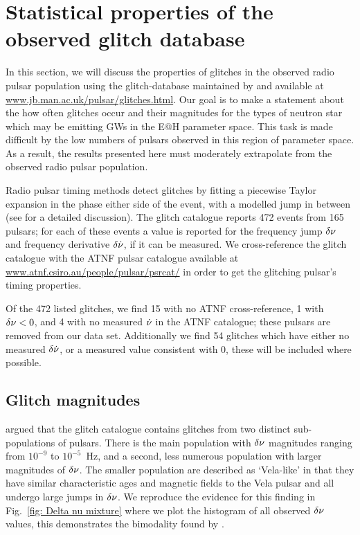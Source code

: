 \documentclass[../full_thesis/full_thesis.tex]{subfiles}
\begin{document}
\section{Statistical properties of the observed glitch database}
\label{sec: statistical properties}
In this section, we will discuss the properties of glitches in the observed
radio pulsar population using the glitch-database maintained by \citet{Espinoza2011}
and available at \url{www.jb.man.ac.uk/pulsar/glitches.html}.
Our goal is to make a statement about the how often glitches occur and their
magnitudes for the types of neutron star which may be emitting GWs in the E@H
parameter space. This task is made difficult by the low numbers of pulsars observed
in this region of parameter space. As a result, the results presented here must
moderately extrapolate from the observed radio pulsar population.

Radio pulsar timing methods detect glitches by fitting a piecewise Taylor expansion in
the phase either side of the event, with a modelled jump in between (see
\citet{Edwards2006} for a detailed discussion). The glitch catalogue
\citep{Espinoza2011} reports 472 events from 165 pulsars; for each of these
events a value is reported for the frequency jump $\delta\nu$ and frequency
derivative $\delta\dot{\nu}$, if it can be measured. We
cross-reference the glitch catalogue with the ATNF \citet{ATNF} pulsar
catalogue available at \url{www.atnf.csiro.au/people/pulsar/psrcat/} in order
to get the glitching pulsar's timing properties.

Of the 472 listed glitches, we find 15 with no ATNF cross-reference, 1 with
$\delta\nu < 0$, and 4 with no measured $\dot{\nu}$ in the ATNF catalogue; these
pulsars are removed from our data set. Additionally we find 54 glitches which
have either no measured $\delta\dot{\nu}$, or a measured value consistent with 0,
these will be included where possible.

\subsection{Glitch magnitudes}
\label{sec: observed glitch magnitude}

\citet{Espinoza2011} argued that the glitch catalogue contains glitches from
two distinct sub-populations of pulsars. There is the main population with
$\delta\nu$ magnitudes ranging from $10^{-9}$ to $10^{-5}$~Hz, and a second,
less numerous population with larger magnitudes of $\delta\nu$. The smaller
population are described as `Vela-like' in that they have similar
characteristic ages and magnetic fields to the Vela pulsar and all undergo
large jumps in $\delta\nu$.  We reproduce the evidence for this finding in
Fig.~\ref{fig: Delta nu mixture} where we plot the histogram of all observed
$\delta\nu$ values, this demonstrates the bimodality found by \citet{Espinoza2011}.
\end{document}
